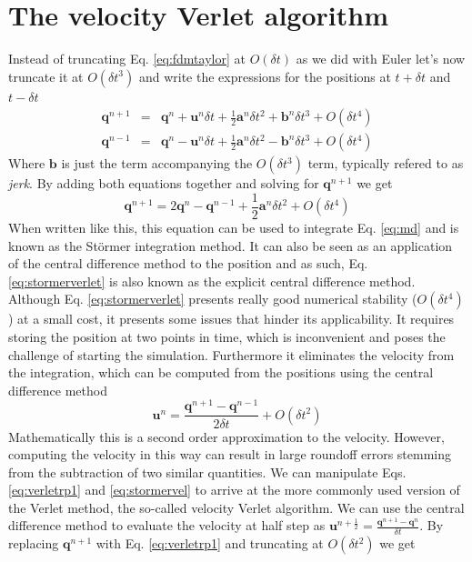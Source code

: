 \documentclass[twoside,openright,titlepage,numbers=noenddot,%
headinclude,footinclude,cleardoublepage=empty,abstract=on,
BCOR=5mm,fontsize=11pt, dvipsnames, paper=b5
]{scrreprt}
\renewcommand{\vec}[1]{\bm{#1}}
\newcommand{\dt}{\delta t}
\newcommand{\half}{\frac{1}{2}}
\newcommand{\ppos}{q}
\newcommand{\pvel}{u}
\begin{document}
\section{The velocity Verlet algorithm}\label{sec:velocityverlet}
Instead of truncating Eq. \eqref{eq:fdmtaylor} at $O(\dt)$ as we did with Euler let's now truncate it at $O(\dt^3)$ and write the expressions for the positions at $t+\dt$ and $t-\dt$
\begin{eqnarray}
  \label{eq:verletrp1}
  \vec{\ppos}^{n+1} &=& \vec{\ppos}^n + \vec{\pvel}^n\dt + \half\vec{a}^n\dt^2 + \vec{b}^n\dt^3 + O(\dt^4)\\
  \vec{\ppos}^{n-1} &=& \vec{\ppos}^n - \vec{\pvel}^n\dt + \half\vec{a}^n\dt^2 - \vec{b}^n\dt^3 + O(\dt^4)
\end{eqnarray}
Where $\vec{b}$ is just the term accompanying the $O(\dt^3)$ term, typically refered to as \emph{jerk}.
By adding both equations together and solving for $\vec{\ppos}^{n+1}$ we get
\begin{equation}
  \label{eq:stormerverlet}
  \vec{\ppos}^{n+1} = 2\vec{\ppos}^n - \vec{\ppos}^{n-1} + \half\vec{a}^n\dt^2 + O(\dt^4)
\end{equation}
When written like this, this equation can be used to integrate Eq. \eqref{eq:md} and is known as the Störmer integration method. It can also be seen as an application of the central difference method to the position and as such, Eq. \eqref{eq:stormerverlet} is also known as the explicit central difference method.
Although Eq. \eqref{eq:stormerverlet} presents really good numerical stability ($O(\dt^4)$) at a small cost, it presents some issues that hinder its applicability.
It requires storing the position at two points in time, which is inconvenient and poses the challenge of starting the simulation.
Furthermore it eliminates the velocity from the integration, which can be computed from the positions using the central difference method
\begin{equation}
  \label{eq:stormervel}
  \vec{\pvel}^n = \frac{\vec{\ppos} ^{n+1} - \vec{\ppos}^{n-1}}{2\dt} + O(\dt^2)
\end{equation}
Mathematically this is a second order approximation to the velocity. However, computing the velocity in this way can result in large roundoff errors stemming from the subtraction of two similar quantities.
We can manipulate Eqs. \eqref{eq:verletrp1} and \eqref{eq:stormervel} to arrive at the more commonly used version of the Verlet method, the so-called velocity Verlet algorithm.
We can use the central difference method to evaluate the velocity at half step as $\vec{\pvel}^{n+\half} = \frac{\vec{\ppos}^{n+1} - \vec{\ppos}^n}{\dt}$. By replacing $\vec{\ppos}^{n+1}$ with Eq. \eqref{eq:verletrp1} and truncating at $O(\dt^2)$ we get
\end{document}
